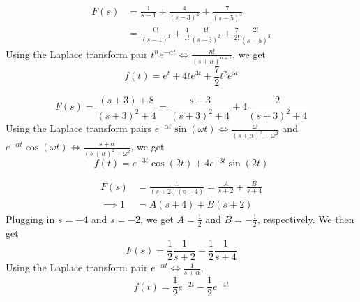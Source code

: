 \documentclass{article}
\begin{document}
\begin{subparts}
    \item \begin{align}
        F(s) &= \frac{1}{s - 1} + \frac{4}{(s - 3)^2} + \frac{7}{(s - 5)^3} \\
        &= \frac{0!}{(s - 1)^1} + \frac{4}{1!} \frac{1!}{(s - 3)^2} + \frac{7}{2!} \frac{2!}{(s - 5)^3}
    \end{align}
    Using the Laplace transform pair \(t^n e^{-\alpha t} \iff \frac{n!}{(s + \alpha)^{n + 1}}\), we get
    \begin{equation}
        f(t) = e^t + 4t e^{3t} + \frac{7}{2} t^2 e^{5t}
    \end{equation}
    \item \begin{equation}
        F(s) = \frac{(s + 3) + 8}{(s + 3)^2 + 4} = \frac{s + 3}{(s + 3)^2 + 4} + 4 \frac{2}{(s + 3)^2 + 4}
    \end{equation}
    Using the Laplace transform pairs \(e^{-\alpha t} \sin(\omega t) \iff \frac{\omega}{(s + \alpha)^2 + \omega^2}\) and \(e^{-\alpha t} \cos(\omega t) \iff \frac{s + \alpha}{(s + \alpha)^2 + \omega^2}\), we get
    \begin{equation}
        f(t) = e^{-3t} \cos(2t) + 4e^{-3t} \sin(2t)
    \end{equation}
    \item \begin{align}
        F(s) &= \frac{1}{(s + 2) (s + 4)} = \frac{A}{s + 2} + \frac{B}{s + 4} \\
        \implies 1 &= A (s + 4) + B (s + 2)
    \end{align}
    Plugging in \(s = -4\) and \(s = -2\), we get \(A = \frac{1}{2}\) and \(B = -\frac{1}{2}\), respectively.
    We then get
    \begin{equation}
        F(s) = \frac{1}{2} \frac{1}{s + 2} - \frac{1}{2} \frac{1}{s + 4}
    \end{equation}
    Using the Laplace transform pair \(e^{-\alpha t} \iff \frac{1}{s + \alpha}\),
    \begin{equation}
        f(t) = \frac{1}{2} e^{-2t} - \frac{1}{2} e^{-4t}
    \end{equation}
\end{subparts}

\question{}
\end{document}
